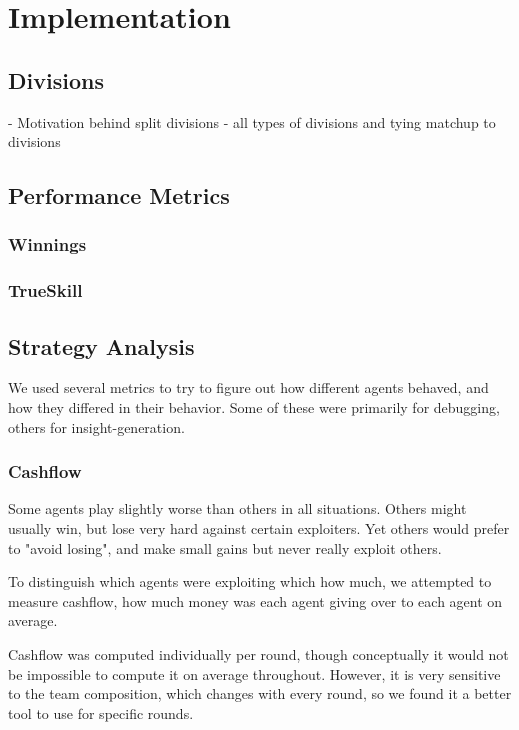 \chapter{Implementation}

\section{Divisions}
- Motivation behind split divisions
- all types of divisions and tying matchup to divisions


\section{Performance Metrics}

\subsection{Winnings}

\subsection{TrueSkill}


\section{Strategy Analysis}

We used several metrics to try to figure out how different agents behaved, and how they differed in their behavior. Some of these were primarily for debugging, others for insight-generation.

\subsection{Cashflow}

Some agents play slightly worse than others in all situations. Others might usually win, but lose very hard against certain exploiters. Yet others would prefer to "avoid losing", and make small gains but never really exploit others.

To distinguish which agents were exploiting which how much, we attempted to measure cashflow, how much money was each agent giving over to each agent on average.


Cashflow was computed individually per round, though conceptually it would not be impossible to compute it on average throughout. However, it is very sensitive to the team composition, which changes with every round, so we found it a better tool to use for specific rounds.

